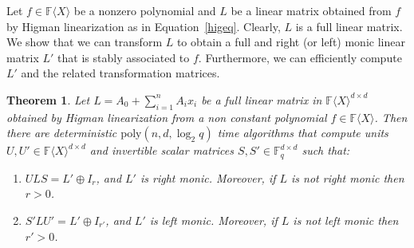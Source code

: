\documentclass[10pt,a4paper]{article}
\newtheorem{theorem}{Theorem}[section]
\newcommand{\F}{\mathbb{F}}
\renewcommand{\angle}[1]{\langle #1 \rangle}
\newcommand{\FX}{\F\angle{X}}
\newcommand{\poly}{\mathrm{poly}}
\newcommand{\fR}{\FX}
\begin{document}
Let $f\in\fR$ be a nonzero polynomial and $L$ be a linear matrix
obtained from $f$ by Higman linearization as in Equation~\ref{higeq}.
Clearly, $L$ is a full linear matrix. We show that we can transform
$L$ to obtain a full and right (or left) monic linear matrix $L'$ that is stably
associated to $f$. Furthermore, we can efficiently compute $L'$ and
the related transformation matrices.

%
%

%
%

%
%

%


\begin{theorem}{\rm\cite{Cohnfir}}\label{full-monic}
  Let $L = A_0 + \sum_{i=1}^n A_i x_i$ be a full linear matrix in
  $\fR^{d\times d}$ obtained by Higman linearization from a non
  constant polynomial $f\in\fR$. Then there are deterministic
  $\poly(n,d,\log_2 q)$ time algorithms that compute units $U, U'\in
  \fR^{d\times d}$ and invertible scalar matrices $S,
  S'\in\F_q^{d\times d}$ such that:
\begin{enumerate}  
\item $ULS= L'\oplus I_r$, and $L'$ is right monic. Moreover, if $L$
  is not right monic then $r>0$.
\item $S'LU'=L'\oplus I_{r'}$, and $L'$ is left monic. Moreover, if $L$ is
  not left monic then $r'>0$.
\end{enumerate}  
\end{theorem}
\end{document}
